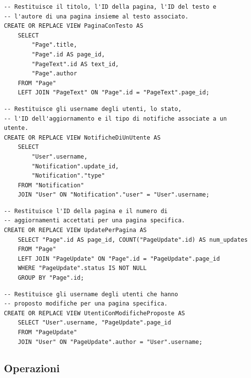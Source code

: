 \documentclass{article}
\begin{document}
\begin{lstlisting}[caption={Vista PaginaConTesto}, label={lst:pagina_con_testo}, style=SQL]
-- Restituisce il titolo, l'ID della pagina, l'ID del testo e 
-- l'autore di una pagina insieme al testo associato.
CREATE OR REPLACE VIEW PaginaConTesto AS
	SELECT 
		"Page".title, 
		"Page".id AS page_id, 
		"PageText".id AS text_id, 
		"Page".author
	FROM "Page"
	LEFT JOIN "PageText" ON "Page".id = "PageText".page_id;
\end{lstlisting}


\begin{lstlisting}[caption={Vista NotificheDiUnUtente}, label={lst:notifiche_di_un_utente}, style=SQL]
-- Restituisce gli username degli utenti, lo stato, 
-- l'ID dell'aggiornamento e il tipo di notifiche associate a un utente.
CREATE OR REPLACE VIEW NotificheDiUnUtente AS
	SELECT 
		"User".username, 
		"Notification".update_id,
		"Notification"."type"
	FROM "Notification"
	JOIN "User" ON "Notification"."user" = "User".username;
\end{lstlisting}

\newpage

\begin{lstlisting}[caption={Vista UpdatePerPagina}, label={lst:update_per_pagina}, style=SQL]
-- Restituisce l'ID della pagina e il numero di 
-- aggiornamenti accettati per una pagina specifica.
CREATE OR REPLACE VIEW UpdatePerPagina AS
	SELECT "Page".id AS page_id, COUNT("PageUpdate".id) AS num_updates
	FROM "Page"
	LEFT JOIN "PageUpdate" ON "Page".id = "PageUpdate".page_id
	WHERE "PageUpdate".status IS NOT NULL
	GROUP BY "Page".id;
\end{lstlisting}

\begin{lstlisting}[caption={Vista UtentiConModificheProposte}, label={lst:utenti_con_modifiche_proposte}, style=SQL]
-- Restituisce gli username degli utenti che hanno 
-- proposto modifiche per una pagina specifica.
CREATE OR REPLACE VIEW UtentiConModificheProposte AS
	SELECT "User".username, "PageUpdate".page_id
	FROM "PageUpdate"
	JOIN "User" ON "PageUpdate".author = "User".username;
\end{lstlisting}

\newpage

\subsection{Operazioni}
\end{document}
